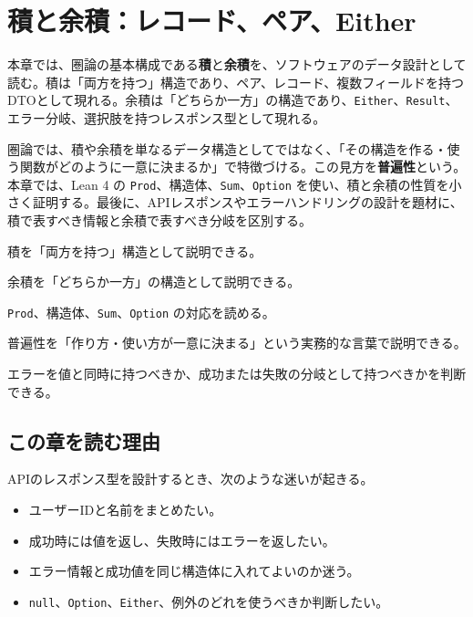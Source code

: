 \chapter{積と余積：レコード、ペア、Either}
\label{chap:products-coproducts}

\begin{chapterabstract}
本章では、圏論の基本構成である\textbf{積}と\textbf{余積}を、ソフトウェアのデータ設計として読む。積は「両方を持つ」構造であり、ペア、レコード、複数フィールドを持つDTOとして現れる。余積は「どちらか一方」の構造であり、\texttt{Either}、\texttt{Result}、エラー分岐、選択肢を持つレスポンス型として現れる。

圏論では、積や余積を単なるデータ構造としてではなく、「その構造を作る・使う関数がどのように一意に決まるか」で特徴づける。この見方を\textbf{普遍性}という。本章では、Lean 4 の \texttt{Prod}、構造体、\texttt{Sum}、\texttt{Option} を使い、積と余積の性質を小さく証明する。最後に、APIレスポンスやエラーハンドリングの設計を題材に、積で表すべき情報と余積で表すべき分岐を区別する。
\end{chapterabstract}

\begin{learninggoals}
\item 積を「両方を持つ」構造として説明できる。
\item 余積を「どちらか一方」の構造として説明できる。
\item \texttt{Prod}、構造体、\texttt{Sum}、\texttt{Option} の対応を読める。
\item 普遍性を「作り方・使い方が一意に決まる」という実務的な言葉で説明できる。
\item エラーを値と同時に持つべきか、成功または失敗の分岐として持つべきかを判断できる。
\end{learninggoals}

\section{この章を読む理由}

APIのレスポンス型を設計するとき、次のような迷いが起きる。

\begin{itemize}
\item ユーザーIDと名前をまとめたい。
\item 成功時には値を返し、失敗時にはエラーを返したい。
\item エラー情報と成功値を同じ構造体に入れてよいのか迷う。
\item \texttt{null}、\texttt{Option}、\texttt{Either}、例外のどれを使うべきか判断したい。
\end{itemize}


